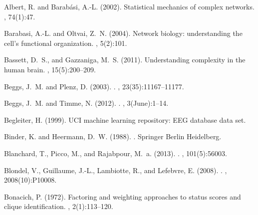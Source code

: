 \documentclass[preprintnumbers,amsmath,amssymb,onecolumn]{revtex4}
\begin{document}
%
%
\begin{thebibliography}{99}

Albert, R. and Barab{\'a}si, A.-L. (2002).
\newblock Statistical mechanics of complex networks.
, 74(1):47.

Barabasi, A.-L. and Oltvai, Z.~N. (2004).
\newblock Network biology: understanding the cell's functional organization.
, 5(2):101.

Bassett, D.~S., and Gazzaniga, M.~S. (2011).
\newblock Understanding complexity in the human brain. 
, 15(5):200--209.

Beggs, J.~M. and Plenz, D. (2003).
.
, 23(35):11167--11177.

Beggs, J.~M. and Timme, N. (2012).
.
, 3(June):1--14.

Begleiter, H. (1999).
\newblock UCI machine learning repository: EEG database data set.

Binder, K. and Heermann, D.~W. (1988).
.
\newblock Springer Berlin Heidelberg.

Blanchard, T., Picco, M., and Rajabpour, M.~a. (2013).
.
, 101(5):56003.

Blondel, V., Guillaume, J.-L., Lambiotte, R., and Lefebvre, E. (2008).
.
,
  2008(10):P10008.

Bonacich, P. (1972).
\newblock Factoring and weighting approaches to status scores and clique
  identification.
, 2(1):113--120.


\end{thebibliography}
\end{document}
